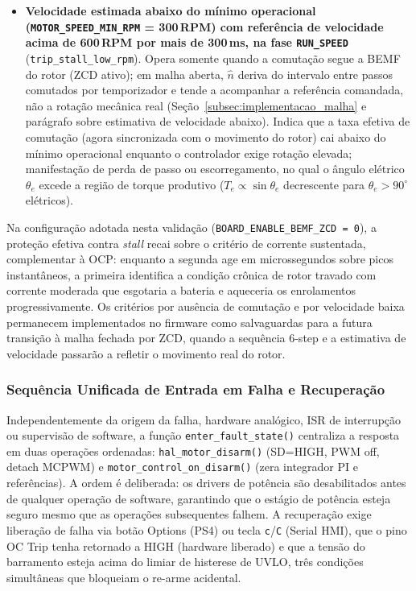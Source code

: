 \begin{itemize}
    \item \textbf{Velocidade estimada abaixo do mínimo operacional (\texttt{MOTOR\_SPEED\_MIN\_RPM} = 300\,RPM) com referência de velocidade acima de 600\,RPM por mais de 300\,ms, na fase \texttt{RUN\_SPEED}} (\texttt{trip\_stall\_low\_rpm}).
    Opera somente quando a comutação segue a BEMF do rotor (ZCD ativo); em malha aberta, $\widehat{n}$ deriva do intervalo entre passos comutados por temporizador e tende a acompanhar a referência comandada, não a rotação mecânica real (Seção~\ref{subsec:implementacao_malha} e parágrafo sobre estimativa de velocidade abaixo). Indica que a taxa efetiva de comutação (agora sincronizada com o movimento do rotor) cai abaixo do mínimo operacional enquanto o controlador exige rotação elevada; manifestação de perda de passo ou escorregamento, no qual o ângulo elétrico $\theta_e$ excede a região de torque produtivo ($T_e \propto \sin\theta_e$ decrescente para $\theta_e > 90^\circ$ elétricos).
\end{itemize}

Na configuração adotada nesta validação (\texttt{BOARD\_ENABLE\_BEMF\_ZCD\,=\,0}), a proteção efetiva contra \textit{stall} recai sobre o critério de corrente sustentada, complementar à OCP: enquanto a segunda age em microssegundos sobre picos instantâneos, a primeira identifica a condição crônica de rotor travado com corrente moderada que esgotaria a bateria e aqueceria os enrolamentos progressivamente. Os critérios por ausência de comutação e por velocidade baixa permanecem implementados no firmware como salvaguardas para a futura transição à malha fechada por ZCD, quando a sequência 6-step e a estimativa de velocidade passarão a refletir o movimento real do rotor.

\subsubsection{Sequência Unificada de Entrada em Falha e Recuperação}

Independentemente da origem da falha, hardware analógico, ISR de interrupção ou supervisão de software, a função \texttt{enter\_fault\_state()} centraliza a resposta em duas operações ordenadas: \texttt{hal\_motor\_disarm()} (SD=HIGH, PWM off, detach MCPWM) e \texttt{motor\_control\_on\_disarm()} (zera integrador PI e referências). A ordem é deliberada: os drivers de potência são desabilitados antes de qualquer operação de software, garantindo que o estágio de potência esteja seguro mesmo que as operações subsequentes falhem. A recuperação exige liberação de falha via botão Options (PS4) ou tecla \texttt{c}/\texttt{C} (Serial HMI), que o pino OC Trip tenha retornado a HIGH (hardware liberado) e que a tensão do barramento esteja acima do limiar de histerese de UVLO, três condições simultâneas que bloqueiam o re-arme acidental.

